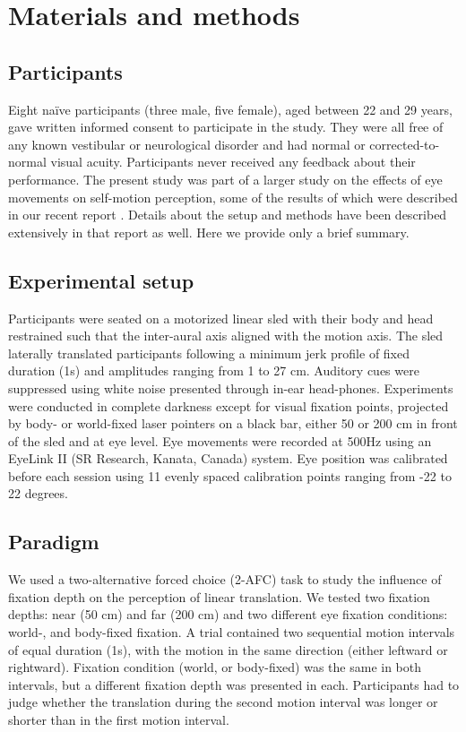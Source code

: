 \section{Materials and methods}

\subsection{Participants}

Eight naïve participants (three male, five female), aged between 22 and 29 years, gave written informed consent to participate in the study. They were all free of any known vestibular or neurological disorder and had normal or corrected-to-normal visual acuity. Participants never received any feedback about their performance. The present study was part of a larger study on the effects of eye movements on self-motion perception, some of the results of which were described in our recent report \cite{clemens2015a}. Details about the setup and methods have been described extensively in that report as well. Here we provide only a brief summary.


\subsection{Experimental setup}

Participants were seated on a motorized linear sled with their body and head restrained such that the inter-aural axis aligned with the motion axis. The sled laterally translated participants following a minimum jerk profile of fixed duration (1s) and amplitudes ranging from 1 to 27 \si{\centi\metre}. Auditory cues were suppressed using white noise presented through in-ear head-phones. Experiments were conducted in complete darkness except for visual fixation points, projected by body- or world-fixed laser pointers on a black bar, either 50 or 200 \si{\centi\metre} in front of the sled and at eye level. Eye movements were recorded at 500Hz using an EyeLink II (SR Research, Kanata, Canada) system. Eye position was calibrated before each session using 11 evenly spaced calibration points ranging from -22 to 22 degrees.


\subsection{Paradigm}

We used a two-alternative forced choice (2-AFC) task to study the influence of fixation depth on the perception of linear translation. We tested two fixation depths: near (50 cm) and far (200 \si{\centi\metre}) and two different eye fixation conditions: world-, and body-fixed fixation. A trial contained two sequential motion intervals of equal duration (1s), with the motion in the same direction (either leftward or rightward). Fixation condition (world, or body-fixed) was the same in both intervals, but a different fixation depth was presented in each. Participants had to judge whether the translation during the second motion interval was longer or shorter than in the first motion interval.

